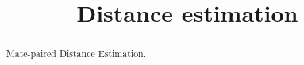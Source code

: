 \documentclass[12pt,a4paper,oneside]{article}
\title{Distance estimation}
\begin{document}
\maketitle

\begin{abstract}
Mate-paired Distance Estimation.
\end{abstract}
\end{document}

